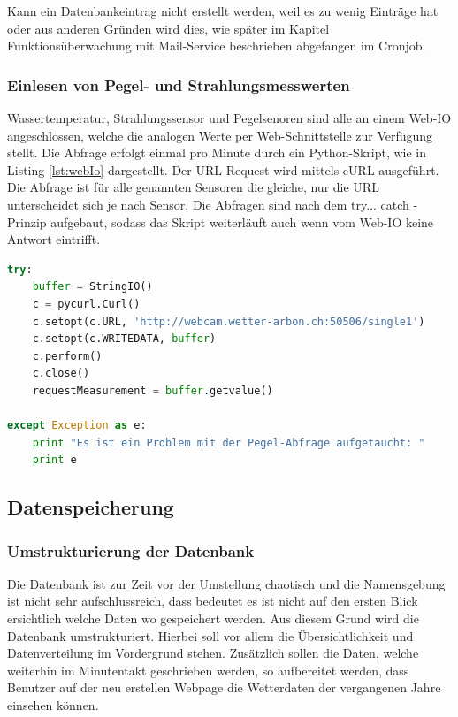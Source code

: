 Kann ein Datenbankeintrag nicht erstellt werden, weil es zu wenig Einträge hat oder aus anderen Gründen wird dies, wie später im Kapitel Funktionsüberwachung mit Mail-Service beschrieben abgefangen im Cronjob.  

\subsubsection{Einlesen von Pegel- und Strahlungsmesswerten}
Wassertemperatur, Strahlungssensor und Pegelsenoren sind alle an einem Web-IO angeschlossen, welche die analogen Werte per Web-Schnittstelle zur Verfügung stellt. Die Abfrage erfolgt einmal pro Minute durch ein Python-Skript, wie in Listing \ref{lst:webIo} dargestellt. Der URL-Request wird mittels cURL ausgeführt. Die Abfrage ist für alle genannten Sensoren die gleiche, nur die URL unterscheidet sich je nach Sensor. Die Abfragen sind nach dem try... catch - Prinzip aufgebaut, sodass das Skript weiterläuft auch wenn vom Web-IO keine Antwort eintrifft.

\begin{lstlisting}[label=lst:webIo,caption=Web-Abfrage des Pegel-Messwerts, language=python, style=py]
try:
    buffer = StringIO()
    c = pycurl.Curl()
    c.setopt(c.URL, 'http://webcam.wetter-arbon.ch:50506/single1')
    c.setopt(c.WRITEDATA, buffer)
    c.perform()
    c.close()
    requestMeasurement = buffer.getvalue()

except Exception as e:
    print "Es ist ein Problem mit der Pegel-Abfrage aufgetaucht: "
    print e
\end{lstlisting}


\subsection{Datenspeicherung}
\subsubsection{Umstrukturierung der Datenbank}
Die Datenbank ist zur Zeit vor der Umstellung chaotisch und die Namensgebung ist nicht sehr aufschlussreich, dass bedeutet es ist nicht auf den ersten Blick ersichtlich welche Daten wo gespeichert werden. Aus diesem Grund wird die Datenbank umstrukturiert. Hierbei soll vor allem die Übersichtlichkeit und Datenverteilung im Vordergrund stehen. Zusätzlich sollen die Daten, welche weiterhin im Minutentakt geschrieben werden, so aufbereitet werden, dass Benutzer auf der neu erstellen Webpage die Wetterdaten der vergangenen Jahre einsehen können.

